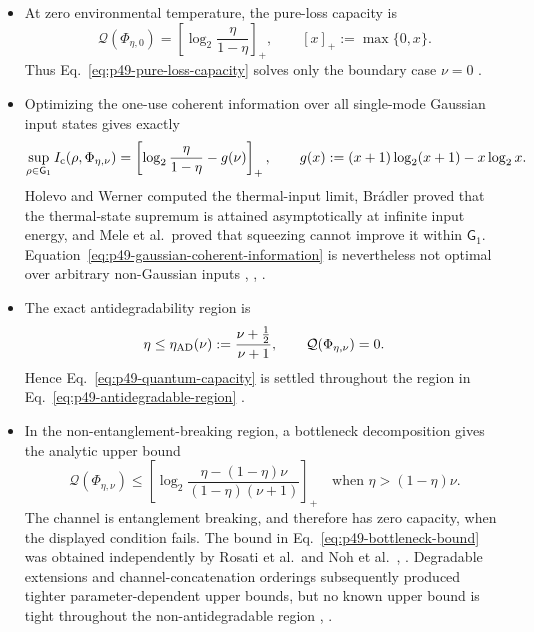 \begin{itemize}
  \item At zero environmental temperature, the pure-loss capacity is
  \begin{equation}
    \mathcal Q(\Phi_{\eta,0})
    =\left[\log_2\frac{\eta}{1-\eta}\right]_+,
    \qquad [x]_+:=\max\{0,x\}.
    \label{eq:p49-pure-loss-capacity}
  \end{equation}
  Thus Eq.~\eqref{eq:p49-pure-loss-capacity} solves only the boundary case
  $\nu=0$ .

  \item Optimizing the one-use coherent information over all single-mode
  Gaussian input states gives exactly
  \begin{equation}
    \sup_{\rho\in\mathsf G_1}I_{\rm c}(\rho,\Phi_{\eta,\nu})
    =\left[\log_2\frac{\eta}{1-\eta}-g(\nu)\right]_+,
    \qquad
    g(x):=(x+1)\log_2(x+1)-x\log_2x.
    \label{eq:p49-gaussian-coherent-information}
  \end{equation}
  Holevo and Werner computed the thermal-input limit, Br\'adler proved that
  the thermal-state supremum is attained asymptotically at infinite input
  energy, and Mele et al.\ proved that squeezing cannot improve it within
  $\mathsf G_1$.  Equation~\eqref{eq:p49-gaussian-coherent-information} is
  nevertheless not optimal over arbitrary non-Gaussian inputs
  ,
  ,
  .

  \item The exact antidegradability region is
  \begin{equation}
    \eta\leq\eta_{\rm AD}(\nu):=
    \frac{\nu+\frac12}{\nu+1},
    \qquad \mathcal Q(\Phi_{\eta,\nu})=0.
    \label{eq:p49-antidegradable-region}
  \end{equation}
  Hence Eq.~\eqref{eq:p49-quantum-capacity} is settled throughout the region
  in Eq.~\eqref{eq:p49-antidegradable-region}
  .

  \item In the non-entanglement-breaking region, a bottleneck decomposition
  gives the analytic upper bound
  \begin{equation}
    \mathcal Q(\Phi_{\eta,\nu})
    \leq\left[
      \log_2\frac{\eta-(1-\eta)\nu}{(1-\eta)(\nu+1)}
    \right]_+
    \quad\text{when }\eta>(1-\eta)\nu.
    \label{eq:p49-bottleneck-bound}
  \end{equation}
  The channel is entanglement breaking, and therefore has zero capacity,
  when the displayed condition fails.  The bound in
  Eq.~\eqref{eq:p49-bottleneck-bound} was obtained independently by Rosati
  et al.\ and Noh et al.\
  ,
  .  Degradable extensions and
  channel-concatenation orderings subsequently produced tighter
  parameter-dependent upper bounds, but no known upper bound is tight
  throughout the non-antidegradable region
  ,
  .


\end{itemize}
